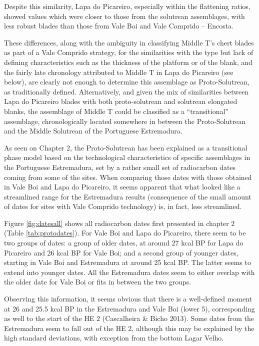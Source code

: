\documentclass[12pt,twoside]{reedthesis}
\begin{document}
Despite this similarity, Lapa do Picareiro, especially within the flattening ratios, showed values which were closer to those from the solutrean assemblages, with less robust blades than those from Vale Boi and Vale Comprido -- Encosta.

These differences, along with the ambiguity in classifying Middle T's chert blades as part of a Vale Comprido strategy, for the similarities with the type but lack of defining characteristics such as the thickness of the platform or of the blank, and the fairly late chronology attributed to Middle T in Lapa do Picareiro (see below), are clearly not enough to determine this assemblage as Proto-Solutrean, as traditionally defined. Alternatively, and given the mix of similarities between Lapa do Picareiro blades with both proto-solutrean and solutrean elongated blanks, the assemblage of Middle T could be classified as a ``transitional'' assemblage, chronologically located somewhere in between the Proto-Solutrean and the Middle Solutrean of the Portuguese Estremadura.

As seen on Chapter 2, the Proto-Solutrean has been explained as a transitional phase model based on the technological characteristics of specific assemblages in the Portuguese Estremadura, set by a rather small set of radiocarbon dates coming from some of the sites. When comparing those dates with those obtained in Vale Boi and Lapa do Picareiro, it seems apparent that what looked like a streamlined range for the Estremadura results (consequence of the small amount of dates for sites with Vale Comprido technology) is, in fact, less streamlined.

Figure \ref{fig:datesall} shows all radiocarbon dates first presented in chapter 2 (Table \ref{tab:protodates}). For Vale Boi and Lapa do Picareiro, there seem to be two groups of dates: a group of older dates, at around 27 kcal BP for Lapa do Picareiro and 26 kcal BP for Vale Boi; and a second group of younger dates, starting in Vale Boi and Estremadura at around 25 kcal BP. The latter seems to extend into younger dates. All the Estremadura dates seem to either overlap with the older date for Vale Boi or fits in between the two groups.

Observing this information, it seems obvious that there is a well-defined moment at 26 and 25.5 kcal BP in the Estremadura and Vale Boi (lower 5), corresponding as well to the start of the HE 2 (Cascalheira \& Bicho 2013). Some dates from the Estremadura seem to fall out of the HE 2, although this may be explained by the high standard deviations, with exception from the bottom Lagar Velho.
\end{document}
